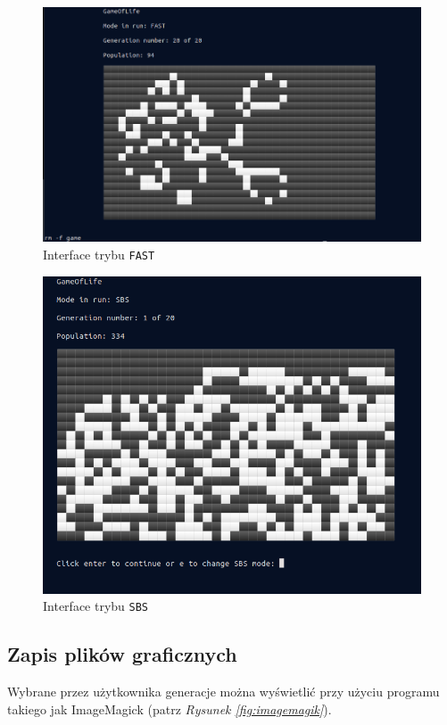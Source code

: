 \documentclass[a4paper]{article}
\begin{document}
\begin{figure}[h!]
        \centering
        \includegraphics[scale=0.28]{FAST}
	\caption{Interface trybu \texttt{FAST}}
        \label{fig:fast}
\end{figure}

\begin{figure}[h!]
        \centering
	\includegraphics[scale=0.28]{sbs1}
	\caption{Interface trybu \texttt{SBS}}
        \label{fig:sbs1}
\end{figure}

\newpage

\subsection{Zapis plik\'ow graficznych}
\quad Wybrane przez u\.zytkownika generacje mo\.zna wy\'swietli\'c przy u\.zyciu programu takiego jak ImageMagick (patrz \textit{Rysunek \ref{fig:imagemagik}}).
\end{document}
